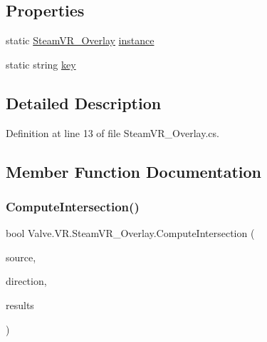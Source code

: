 \subsection*{Properties}
\begin{DoxyCompactItemize}
\item 
static \mbox{\hyperlink{class_valve_1_1_v_r_1_1_steam_v_r___overlay}{Steam\+V\+R\+\_\+\+Overlay}} \mbox{\hyperlink{class_valve_1_1_v_r_1_1_steam_v_r___overlay_aad1019110da831b03ec485056f846822}{instance}}
\item 
static string \mbox{\hyperlink{class_valve_1_1_v_r_1_1_steam_v_r___overlay_abcca08e2e6e1afe4cbd813abca787701}{key}}
\end{DoxyCompactItemize}


\subsection{Detailed Description}


Definition at line 13 of file Steam\+V\+R\+\_\+\+Overlay.\+cs.



\subsection{Member Function Documentation}
\mbox{\label{class_valve_1_1_v_r_1_1_steam_v_r___overlay_a4df3ccd3cf4e377f2e921100c78d5f8e}} 
\subsubsection{\texorpdfstring{ComputeIntersection()}{ComputeIntersection()}}
{\footnotesize\ttfamily bool Valve.\+V\+R.\+Steam\+V\+R\+\_\+\+Overlay.\+Compute\+Intersection (\begin{DoxyParamCaption}\item[{Vector3}]{source,  }\item[{Vector3}]{direction,  }\item[{ref \mbox{\hyperlink{struct_valve_1_1_v_r_1_1_steam_v_r___overlay_1_1_intersection_results}{Intersection\+Results}}}]{results }\end{DoxyParamCaption})}



